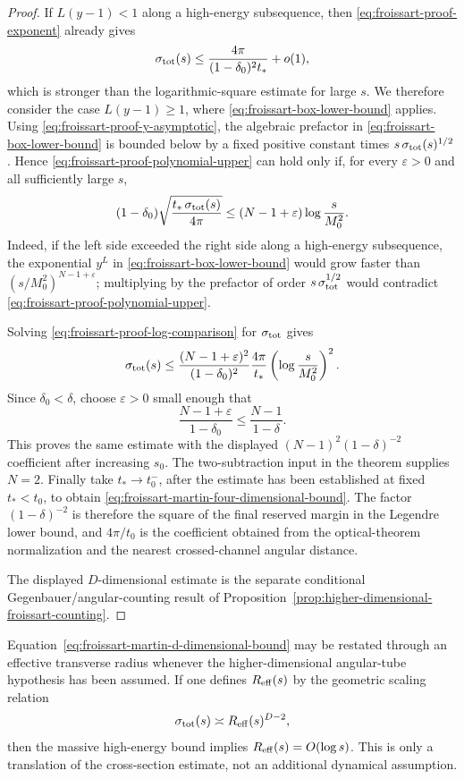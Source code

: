 \begin{proof}
If \(L(y-1)<1\) along a high-energy subsequence, then
\eqref{eq:froissart-proof-exponent} already gives
\[
  \sigma_{\rm tot}(s)
  \le
  \frac{4\pi}{(1-\delta_0)^2t_*}+o(1),
\]
which is stronger than the logarithmic-square estimate for large \(s\).  We
therefore consider the case \(L(y-1)\ge1\), where
\eqref{eq:froissart-box-lower-bound} applies.  Using
\eqref{eq:froissart-proof-y-asymptotic}, the algebraic prefactor in
\eqref{eq:froissart-box-lower-bound} is bounded below by a fixed positive
constant times \(s\,\sigma_{\rm tot}(s)^{1/2}\).  Hence
\eqref{eq:froissart-proof-polynomial-upper} can hold only if, for every
\(\varepsilon>0\) and all sufficiently large \(s\),
\begin{equation}
  (1-\delta_0)
  \sqrt{\frac{t_*\,\sigma_{\rm tot}(s)}{4\pi}}
  \le
  (N-1+\varepsilon)\log\frac{s}{M_0^2}.
  \label{eq:froissart-proof-log-comparison}
\end{equation}
Indeed, if the left side exceeded the right side along a high-energy
subsequence, the exponential \(y^L\) in
\eqref{eq:froissart-box-lower-bound} would grow faster than
\((s/M_0^2)^{N-1+\varepsilon}\); multiplying by the prefactor of order
\(s\,\sigma_{\rm tot}^{1/2}\) would contradict
\eqref{eq:froissart-proof-polynomial-upper}.

Solving \eqref{eq:froissart-proof-log-comparison} for
\(\sigma_{\rm tot}\) gives
\[
  \sigma_{\rm tot}(s)
  \le
  \frac{(N-1+\varepsilon)^2}{(1-\delta_0)^2}
  \frac{4\pi}{t_*}
  \left(\log\frac{s}{M_0^2}\right)^2 .
\]
Since \(\delta_0<\delta\), choose \(\varepsilon>0\) small enough that
\[
  \frac{N-1+\varepsilon}{1-\delta_0}
  \le
  \frac{N-1}{1-\delta}.
\]
This proves the same estimate with the displayed \((N-1)^2(1-\delta)^{-2}\)
coefficient after increasing \(s_0\).  The two-subtraction input in the theorem
supplies \(N=2\).  Finally take \(t_*\to t_0^-\), after the estimate has been
established at fixed \(t_*<t_0\), to obtain
\eqref{eq:froissart-martin-four-dimensional-bound}.  The factor
\((1-\delta)^{-2}\) is therefore the square of the final reserved margin in
the Legendre lower bound, and \(4\pi/t_0\) is the coefficient obtained from
the optical-theorem normalization and the nearest crossed-channel angular
distance.

The displayed \(D\)-dimensional estimate is the separate conditional
Gegenbauer/angular-counting result of
Proposition~\ref{prop:higher-dimensional-froissart-counting}.
\end{proof}

Equation~\eqref{eq:froissart-martin-d-dimensional-bound} may be restated
through an effective transverse radius whenever the higher-dimensional
angular-tube hypothesis has been assumed.  If one defines \(R_{\rm eff}(s)\)
by the geometric scaling relation
\[
  \sigma_{\rm tot}(s)\asymp R_{\rm eff}(s)^{D-2},
\]
then the massive high-energy bound implies \(R_{\rm eff}(s)=O(\log s)\).
This is only a translation of the cross-section estimate, not an additional
dynamical assumption.

